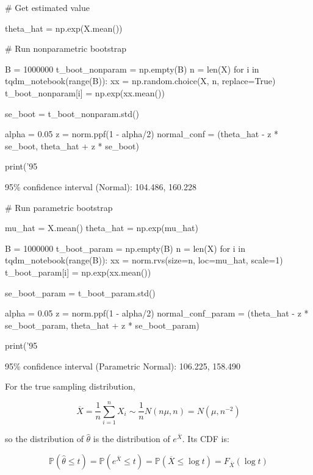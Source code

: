 \begin{python}
# Get estimated value

theta_hat = np.exp(X.mean())

# Run nonparametric bootstrap

B = 1000000
t_boot_nonparam = np.empty(B)
n = len(X)
for i in tqdm_notebook(range(B)):
    xx = np.random.choice(X, n, replace=True)
    t_boot_nonparam[i] = np.exp(xx.mean())
    
se_boot = t_boot_nonparam.std()

alpha = 0.05
z = norm.ppf(1 - alpha/2)
normal_conf = (theta_hat - z * se_boot, theta_hat + z * se_boot)

print('95%
\end{python}

\begin{console}
95\% confidence interval (Normal):        104.486, 160.228
\end{console}

\begin{python}
# Run parametric bootstrap

mu_hat = X.mean()
theta_hat = np.exp(mu_hat)

B = 1000000
t_boot_param = np.empty(B)
n = len(X)
for i in tqdm_notebook(range(B)):
    xx = norm.rvs(size=n, loc=mu_hat, scale=1)
    t_boot_param[i] = np.exp(xx.mean())
    
se_boot_param = t_boot_param.std()

alpha = 0.05
z = norm.ppf(1 - alpha/2)
normal_conf_param = (theta_hat - z * se_boot_param, theta_hat + z * se_boot_param)

print('95%
\end{python}


\begin{console}
95\% confidence interval (Parametric Normal):     106.225, 158.490
\end{console}

For the true sampling distribution,

\[ \overline{X} = \frac{1}{n} \sum_{i=1}^n X_i \sim \frac{1}{n} N(n \mu, n) = N(\mu, n^{-2})\]

so the distribution of \(\hat{\theta}\) is the distribution of
\(e^\overline{X}\). Its CDF is:

\[
\mathbb{P}\left(\hat{\theta} \leq t\right) = 
\mathbb{P}\left(e^\overline{X} \leq t\right) = 
\mathbb{P}\left(\overline{X} \leq \log t\right) = F_{\overline{X}}\left(\log t\right)
\]

